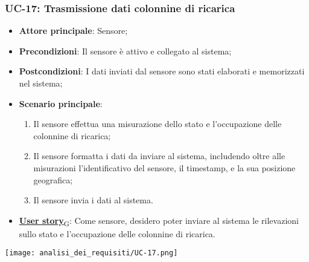 \subsubsection{UC-17: Trasmissione dati colonnine di ricarica}
\begin{itemize}
	\item \textbf{Attore principale}: Sensore;
	\item \textbf{Precondizioni}: Il sensore è attivo e collegato al sistema;
	\item \textbf{Postcondizioni}: I dati inviati dal sensore sono stati elaborati e memorizzati nel sistema;
	\item \textbf{Scenario principale}:
	      \begin{enumerate}
		      \item Il sensore effettua una misurazione dello stato e l'occupazione delle colonnine di ricarica;
		      \item Il sensore formatta i dati da inviare al sistema, includendo oltre alle misurazioni l'identificativo del sensore,
		            il timestamp, e la sua posizione geografica;
		      \item Il sensore invia i dati al sistema.
	      \end{enumerate}
	\item \href{https://7last.github.io/docs/rtb/documentazione-interna/glossario\#user-story}{\textbf{User story}\textsubscript{G}}: Come sensore, desidero poter inviare al sistema le rilevazioni sullo stato e l'occupazione delle colonnine di ricarica.
\end{itemize}
\begin{center}
	\texttt{[image: analisi\_dei\_requisiti/UC-17.png]}
\end{center}

